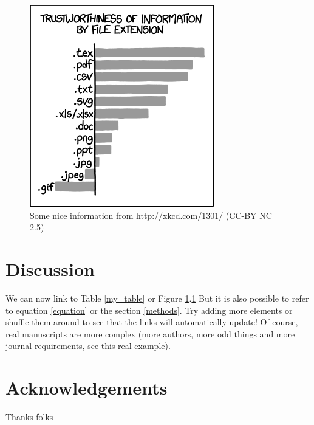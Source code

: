 \documentclass[12pt,letterpaper]{article}
\begin{document}
\begin{figure}[!htpb]
\centering
    \includegraphics{file_extension_xkcd_1301.png} %
\caption{Some nice information from http://xkcd.com/1301/ (CC-BY NC 2.5)} %
\label{my_figure}
\end{figure}

\newpage %

\section{Discussion}
We can now link to Table \ref{my_table} or Figure \ref{my_figure}.\ref{my_figure}
But it is also possible to refer to equation \ref{equation} or the section \ref{methods}.
Try adding more elements or shuffle them around to see that the links will automatically update!
Of course, real manuscripts are more complex (more authors, more odd things and more journal requirements, see \href{https://github.com/TGuillerme/Total_Evidence_Method-Missing_data/blob/master/Manuscript/TEM_revised_manuscrip_highlithed.tex}{this real example}). 

\section{Acknowledgements}
Thanks folks






\end{document}
